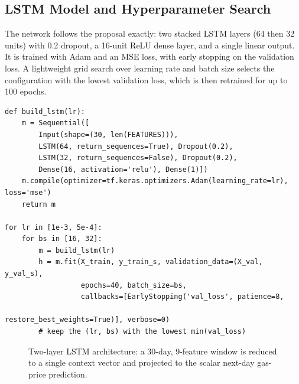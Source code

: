 \documentclass[11pt,a4paper]{article}
\begin{document}
\subsection{LSTM Model and Hyperparameter Search}
The network follows the proposal exactly: two stacked LSTM layers (64 then 32 units) with 0.2
dropout, a 16-unit ReLU dense layer, and a single linear output. It is trained with Adam and an
MSE loss, with early stopping on the validation loss. A lightweight grid search over learning
rate and batch size selects the configuration with the lowest validation loss, which is then
retrained for up to 100 epochs.

\begin{lstlisting}[style=py,caption={Model definition and grid search.}]
def build_lstm(lr):
    m = Sequential([
        Input(shape=(30, len(FEATURES))),
        LSTM(64, return_sequences=True), Dropout(0.2),
        LSTM(32, return_sequences=False), Dropout(0.2),
        Dense(16, activation='relu'), Dense(1)])
    m.compile(optimizer=tf.keras.optimizers.Adam(learning_rate=lr), loss='mse')
    return m

for lr in [1e-3, 5e-4]:
    for bs in [16, 32]:
        m = build_lstm(lr)
        h = m.fit(X_train, y_train_s, validation_data=(X_val, y_val_s),
                  epochs=40, batch_size=bs,
                  callbacks=[EarlyStopping('val_loss', patience=8,
                                           restore_best_weights=True)], verbose=0)
        # keep the (lr, bs) with the lowest min(val_loss)
\end{lstlisting}

\begin{figure}[h]
\centering
{}
\caption{Two-layer LSTM architecture: a 30-day, 9-feature window is reduced to a single
context vector and projected to the scalar next-day gas-price prediction.}
\label{fig:arch}
\end{figure}
\end{document}
